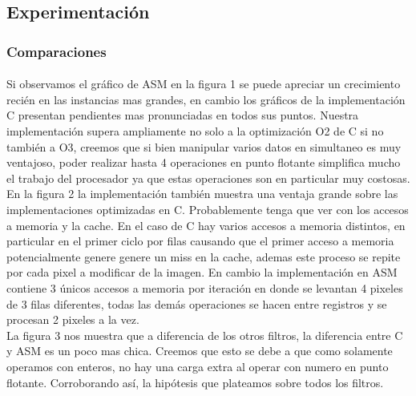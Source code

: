 \documentclass[a4paper]{article}
\begin{document}
\subsection{Experimentaci\'on}

\subsubsection{Comparaciones}

\paragraph{} Si observamos el gr\'afico de ASM en la figura 1 se puede apreciar un crecimiento recién en las instancias mas grandes, en cambio los gr\'aficos de la implementaci\'on C presentan pendientes mas pronunciadas en todos sus puntos. Nuestra implementaci\'on supera ampliamente no solo a la optimizaci\'on O2 de C si no también a O3, creemos que si bien manipular varios datos en simultaneo es muy ventajoso, poder realizar hasta 4 operaciones en punto flotante simplifica mucho el trabajo del procesador ya que estas operaciones son en particular muy costosas.\\
 
 En la figura 2 la implementaci\'on también muestra una ventaja grande sobre las implementaciones optimizadas en C. Probablemente tenga que ver con los accesos a memoria y la cache. En el caso de C hay varios accesos a memoria distintos, en particular en el primer ciclo por filas causando que el primer acceso a memoria potencialmente genere genere un miss en la cache, ademas este proceso se repite por cada pixel a modificar de la imagen. En cambio la implementaci\'on en ASM contiene 3 \'unicos accesos a memoria por iteraci\'on en donde se levantan 4 pixeles de 3 filas diferentes, todas las dem\'as operaciones se hacen entre registros y se procesan 2 pixeles a la vez.  \\

La figura 3 nos muestra que a diferencia de los otros filtros, la diferencia entre C y ASM es un poco mas chica. Creemos que esto se debe a que como solamente operamos con enteros, no hay una carga extra al operar con numero en punto flotante. Corroborando así, la hipótesis que plateamos sobre todos los filtros.
\end{document}
